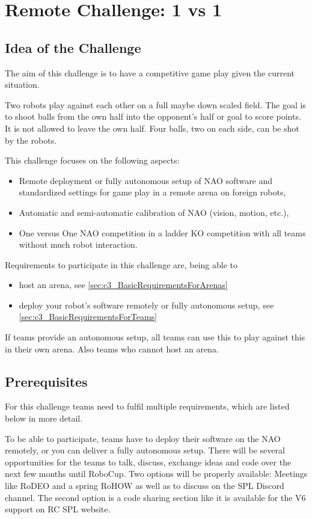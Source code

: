 \section{Remote Challenge: 1 vs 1}
\label{sec:OneVsOneChallenge}

\subsection{Idea of the Challenge}
The aim of this challenge is to have a competitive game play given the current situation. 

Two robots play against each other on a full maybe down scaled field. The goal is to shoot balls from the own half into the opponent's half or goal to score points. It is not allowed to leave the own half. Four balls, two on each side, can be shot by the robots.

This challenge focuses on the following aspects:
\begin{itemize}
    \item Remote deployment or fully autonomous setup of NAO software and standardized settings for game play in a remote arena on foreign robots,
    \item Automatic and semi-automatic calibration of NAO (vision, motion, etc.), 
    \item One versus One NAO competition in a ladder KO competition with all teams without much robot interaction. 
\end{itemize}

Requirements to participate in this challenge are, being able to
\begin{itemize}
	\item host an arena, see \ref{sec:c3_BasicRequirementsForArenas}
	\item deploy your robot's software remotely or fully autonomous setup, see \ref{sec:c3_BasicRequirementsForTeams}
\end{itemize}

If teams provide an autonomous setup, all teams can use this to play against this in their own arena. Also teams who cannot host an arena.

\subsection{Prerequisites}
\label{sec:c3_Prerequisites}
For this challenge teams need to fulfil multiple requirements, which are listed below in more detail.

To be able to participate, teams have to deploy their software on the NAO remotely, or you can deliver a fully autonomous  setup. There will be several opportunities for the teams to talk, discuss, exchange ideas and code over the next few months until RoboCup. Two options will be properly available: Meetings like RoDEO and a spring RoHOW as well as to discuss on the SPL Discord channel. The second option is a code sharing section like it is available for the V6 support on RC SPL website.

